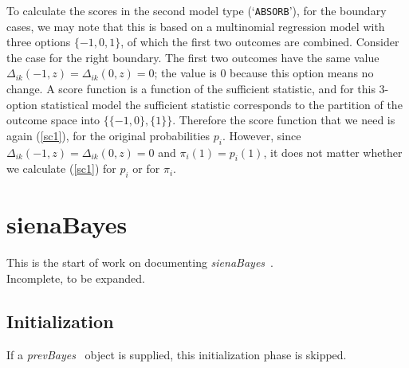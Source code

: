 \documentclass[a4paper,12pt,fleqn]{article}
\newcommand{\nnm}[1]{\textsf{\small\textit{#1}\ }}
\begin{document}
To calculate the scores in the second model type (`\texttt{ABSORB}'),
for the boundary cases,
we may note that this is based on a multinomial regression model
with three options $\{-1, 0, 1\}$, of which the first two outcomes
are combined.
Consider the case for the right boundary.
The first two outcomes have the same value
$\Delta_{ik}(-1,z) = \Delta_{ik}(0,z) = 0$; the value is 0
because this option means no change.
A score function is a function of the sufficient statistic,
and for this 3-option statistical model the sufficient statistic corresponds
to the partition of the outcome space into  $\big\{\{-1, 0\}, \{1\} \big\}$.
Therefore the score function that we need is again (\ref{sc1}),
for the original probabilities $p_i$. However, since
$\Delta_{ik}(-1,z) = \Delta_{ik}(0,z) = 0$ and $\pi_i(1) = p_i(1)$,
it does not matter whether we calculate (\ref{sc1})
for $p_i$ or for $\pi_i$.

\newpage

\section{sienaBayes}

This is the start of work on documenting \nnm{sienaBayes}.\\
Incomplete, to be expanded.
\bigskip


\subsection{Initialization}

If a \nnm{prevBayes} object is supplied, this initialization phase is
skipped.
\end{document}
